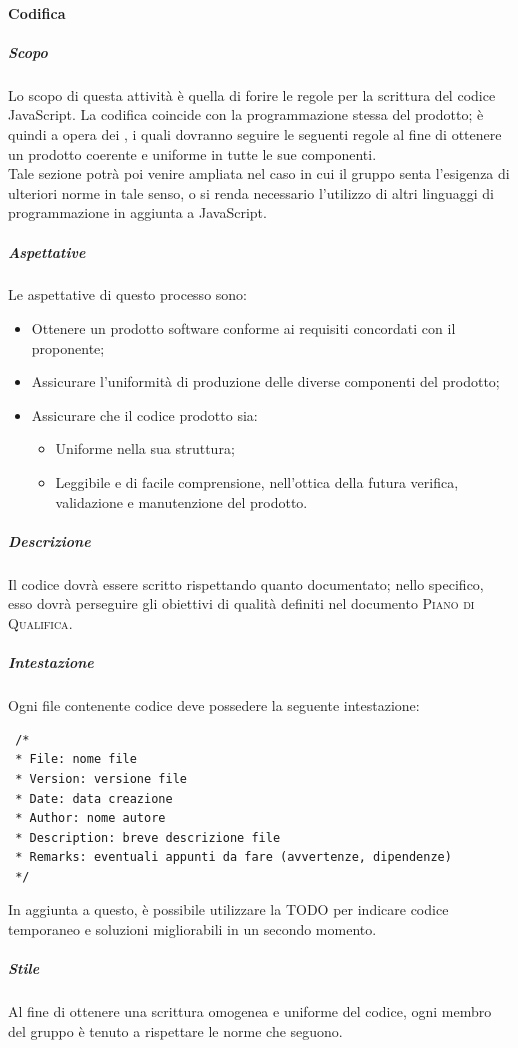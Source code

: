 \documentclass[../norme-di-progetto.tex]{subfiles}
\begin{document}
\paragraph{Codifica}
\subparagraph{Scopo}
Lo scopo di questa attività è quella di forire le regole per la scrittura del codice JavaScript. La codifica coincide con la programmazione stessa del prodotto; è quindi a opera dei , i quali dovranno seguire le seguenti regole al fine di ottenere un prodotto coerente e uniforme in tutte le sue componenti. \\
Tale sezione potrà poi venire ampliata nel caso in cui il gruppo senta l'esigenza di ulteriori norme in tale senso, o si renda necessario l'utilizzo di altri linguaggi di programmazione in aggiunta a JavaScript.
\subparagraph{Aspettative}
Le aspettative di questo processo sono:
\begin{itemize}
  \item Ottenere un prodotto software conforme ai requisiti concordati con il proponente;
  \item Assicurare l'uniformità di produzione delle diverse componenti del prodotto;
  \item Assicurare che il codice prodotto sia:
  \begin{itemize}
    \item Uniforme nella sua struttura;
    \item Leggibile e di facile comprensione, nell'ottica della futura verifica, validazione e manutenzione del prodotto.
  \end{itemize}
\end{itemize}
\subparagraph{Descrizione}
Il codice dovrà essere scritto rispettando quanto documentato; nello specifico, esso dovrà perseguire gli obiettivi di qualità definiti nel documento \textsc{Piano di Qualifica}.

\subparagraph{Intestazione}
Ogni file contenente codice deve possedere la seguente intestazione:
\begin{lstlisting}
 /*
 * File: nome file
 * Version: versione file
 * Date: data creazione
 * Author: nome autore
 * Description: breve descrizione file
 * Remarks: eventuali appunti da fare (avvertenze, dipendenze)
 */
\end{lstlisting}
In aggiunta a questo, è possibile utilizzare la  TODO per indicare codice temporaneo e soluzioni migliorabili in un secondo momento.

\subparagraph{Stile}
Al fine di ottenere una scrittura omogenea e uniforme del codice, ogni membro del gruppo è tenuto a rispettare le norme che seguono.
\end{document}
